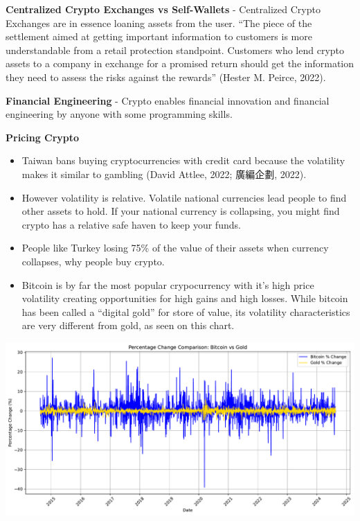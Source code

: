 \documentclass[
  letterpaper,
  DIV=11,
  numbers=noendperiod]{scrartcl}
\begin{document}
\textbf{Centralized Crypto Exchanges vs Self-Wallets} - Centralized
Crypto Exchanges are in essence loaning assets from the user. ``The
piece of the settlement aimed at getting important information to
customers is more understandable from a retail protection standpoint.
Customers who lend crypto assets to a company in exchange for a promised
return should get the information they need to assess the risks against
the rewards'' (Hester M. Peirce, 2022).

\textbf{Financial Engineering} - Crypto enables financial innovation and
financial engineering by anyone with some programming skills.

\textbf{Pricing Crypto}

\begin{itemize}
\item
  Taiwan bans buying cryptocurrencies with credit card because the
  volatility makes it similar to gambling (David Attlee, 2022; 廣編企劃,
  2022).
\item
  However volatility is relative. Volatile national currencies lead
  people to find other assets to hold. If your national currency is
  collapsing, you might find crypto has a relative safe haven to keep
  your funds.
\item
  People like Turkey losing 75\% of the value of their assets when
  currency collapses, why people buy crypto.
\item
  Bitcoin is by far the most popular crypocurrency with it's high price
  volatility creating opportunities for high gains and high losses.
  While bitcoin has been called a ``digital gold'' for store of value,
  its volatility characteristics are very different from gold, as seen
  on this chart.
\end{itemize}

\includegraphics{_thesis_files/figure-pdf/cell-40-output-1.pdf}
\end{document}
